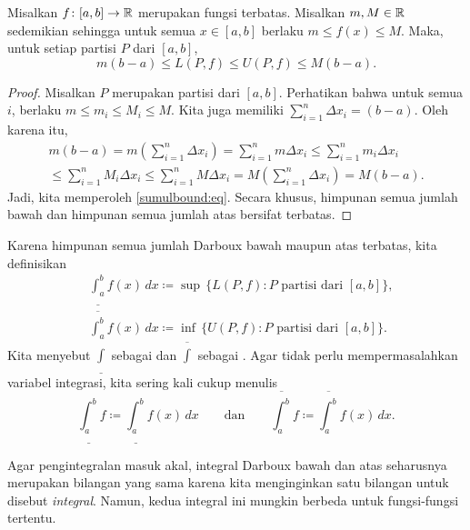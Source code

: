 \begin{prop} \label{sumulbound:prop}
Misalkan $f \colon [a,b] \to {\mathbb{R}}$ merupakan fungsi terbatas.  Misalkan $m, M \in {\mathbb{R}}$ 
sedemikian sehingga untuk semua $x \in [a,b]$ berlaku $m \leq f(x) \leq M$.  Maka, untuk setiap partisi $P$
dari $[a,b]$,
\begin{equation}
\label{sumulbound:eq}
m(b-a) \leq
L(P,f) \leq U(P,f)
\leq M(b-a) .
\end{equation}
\end{prop}

\begin{proof}
Misalkan $P$ merupakan partisi dari $[a,b]$.  Perhatikan bahwa untuk semua $i$,
berlaku $m \leq m_i \leq M_i \leq M$.  Kita juga memiliki
$\sum_{i=1}^n \Delta x_i = (b-a)$.  Oleh karena itu,
\begin{multline*}
m(b-a) =
m \left( \sum_{i=1}^n \Delta x_i \right)
=
\sum_{i=1}^n m \Delta x_i
\leq
\sum_{i=1}^n m_i \Delta x_i 
\\
\leq
\sum_{i=1}^n M_i \Delta x_i
\leq
\sum_{i=1}^n M \Delta x_i 
=
M \left( \sum_{i=1}^n \Delta x_i \right)
=
M(b-a) .
\end{multline*}
Jadi, kita memperoleh \eqref{sumulbound:eq}.  Secara khusus, himpunan semua jumlah
bawah dan himpunan semua jumlah atas bersifat terbatas.
\end{proof}

\begin{defn}
Karena himpunan semua jumlah Darboux bawah maupun atas terbatas, kita definisikan
\begin{align*}
& \underline{\int_a^b} f(x)\,dx \coloneqq
\sup \, \bigl\{ L(P,f) : P \text{ partisi dari } [a,b] \bigr\} , \\
& \overline{\int_a^b} f(x)\,dx \coloneqq
\inf \, \bigl\{ U(P,f) : P \text{ partisi dari } [a,b] \bigr\} .
\end{align*}
Kita menyebut $\underline{\int}$
sebagai \emph{} dan
$\overline{\int}$ sebagai
\emph{}.
Agar tidak perlu mempermasalahkan variabel integrasi, 
kita sering kali cukup menulis
\begin{equation*}
\underline{\int_a^b} f \coloneqq
\underline{\int_a^b} f(x)\,dx 
\qquad \text{dan} \qquad
\overline{\int_a^b} f \coloneqq
\overline{\int_a^b} f(x)\,dx  .
\end{equation*}
\end{defn}

Agar pengintegralan masuk akal, integral Darboux bawah dan atas
seharusnya merupakan bilangan yang sama karena kita menginginkan satu bilangan untuk disebut
\emph{integral}.  Namun, kedua integral ini mungkin berbeda untuk
fungsi-fungsi tertentu.


